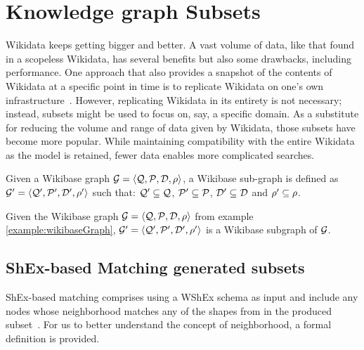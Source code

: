 \section{Knowledge graph Subsets}

Wikidata keeps getting bigger and better. A vast volume of data, like that found in a scopeless Wikidata, has several benefits but also some drawbacks, including performance. One approach that also provides a snapshot of the contents of Wikidata at a specific point in time is to replicate Wikidata on one's own infrastructure~\cite{10.37044/osf.io/wu9et}. However, replicating Wikidata in its entirety is not necessary; instead, subsets might be used to focus on, say, a specific domain. As a substitute for reducing the volume and range of data given by Wikidata, those subsets have become more popular. While maintaining compatibility with the entire Wikidata as the model is retained, fewer data enables more complicated searches.

\begin{definition}
    Given a Wikibase graph $\mathcal{G}=\langle\mathcal{Q},\mathcal{P},\mathcal{D},\rho\rangle$, a Wikibase sub-graph is defined as  $\mathcal{G}'=\langle\mathcal{Q}',\mathcal{P}',\mathcal{D}',\rho'\rangle$ such that: $\mathcal{Q}'\subseteq\mathcal{Q}$, $\mathcal{P}'\subseteq\mathcal{P}$, $\mathcal{D}'\subseteq\mathcal{D}$ and $\rho'\subseteq\rho$.
\end{definition}

\begin{example}
    Given the Wikibase graph $\mathcal{G}=\langle\mathcal{Q},\mathcal{P},\mathcal{D},\rho\rangle$ from example \ref{example:wikibaseGraph}, $\mathcal{G}'=\langle\mathcal{Q}',\mathcal{P}',\mathcal{D}',\rho'\rangle$ is a Wikibase subgraph of $\mathcal{G}$.
\end{example}

\begin{table}[ht]
    \centering
    
\end{table}

\subsection{ShEx-based Matching generated subsets}

ShEx-based matching comprises using a WShEx schema  as input and include any nodes whose neighborhood matches any of the shapes from  in the produced subset~\cite{https://doi.org/10.48550/arxiv.2110.11709}. For us to better understand the concept of neighborhood, a formal definition is provided.


